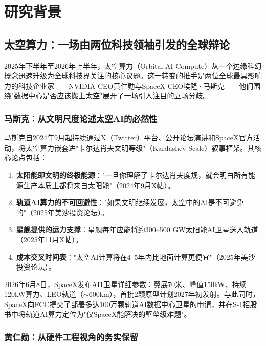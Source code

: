 
\section{研究背景}

\subsection{太空算力：一场由两位科技领袖引发的全球辩论}

2025年下半年至2026年上半年，太空算力（Orbital AI Compute）从一个边缘科幻概念迅速升级为全球科技界关注的核心议题。这一转变的推手是两位全球最具影响力的科技企业家——NVIDIA CEO黄仁勋与SpaceX CEO埃隆·马斯克——他们围绕"数据中心是否应该搬上太空"展开了一场引人注目的立场分歧。

\subsubsection{马斯克：从文明尺度论述太空AI的必然性}

马斯克自2024年9月起持续通过X（Twitter）平台、公开论坛演讲和SpaceX官方活动，将太空算力嵌套进"卡尔达肖夫文明等级"（Kardashev Scale）叙事框架\cite{musk2024kardashev,musk2025us_saudi}。其核心论点包括：

\begin{enumerate}[leftmargin=*]
    \item \textbf{太阳能即文明的终极能源}："一旦你理解了卡尔达肖夫度规，就会明白所有能源生产本质上都将来自太阳能"（2024年9月X帖）\cite{musk2024kardashev}。
    \item \textbf{轨道AI算力的不可回避性}："如果文明继续发展，太空中的AI是不可避免的"（2025年美沙投资论坛）\cite{musk2025us_saudi}。
    \item \textbf{星舰提供的运力支撑}：星舰每年应能将约300--500 GW太阳能AI卫星送入轨道（2025年11月X帖）\cite{musk2025starship}。
    \item \textbf{成本交叉时间表}："太空AI计算将在4--5年内比地面计算更便宜"（2025年美沙投资论坛）\cite{musk2025us_saudi}。
\end{enumerate}

2026年6月8日，SpaceX发布AI1卫星详细参数：翼展70米、峰值150kW、持续120kW算力、LEO轨道（$\sim$600km），首批2颗原型计划2027年初发射\cite{spacex2026ai1}。与此同时，SpaceX向FCC提交了部署多达100万颗轨道AI数据中心卫星的申请\cite{spacex2026fcc}，并在S-1招股书中将轨道AI算力定位为"仅SpaceX能解决的壁垒级难题"\cite{spacex2026s1}。

\subsubsection{黄仁勋：从硬件工程视角的务实保留}


